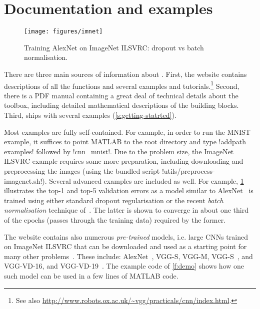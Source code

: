\section{Documentation and examples}\label{s:examples}

\begin{figure}
\centering
\texttt{[image: figures/imnet]}
\vspace{-1em}
\caption{Training AlexNet on ImageNet ILSVRC: dropout vs batch normalisation.}\label{f:imnet}
\end{figure}

There are three main sources of information about \matconvnet. First, the website contains descriptions of all the functions and several examples and tutorials.\footnote{\small See also \url{http://www.robots.ox.ac.uk/~vgg/practicals/cnn/index.html}.} Second, there is a PDF manual containing a great deal of technical details about the toolbox, including detailed mathematical descriptions of the building blocks. Third, \matconvnet ships with several examples (\cref{s:getting-statrted}).

Most examples are fully self-contained. For example, in order to run the MNIST example, it suffices to point MATLAB to the \matconvnet root directory and type !addpath examples! followed by !cnn_mnist!. Due to the problem size, the ImageNet ILSVRC example requires some more preparation, including downloading and preprocessing the images (using the bundled script !utils/preprocess-imagenet.sh!). Several advanced examples are included as well. For example, \cref{f:imnet} illustrates the top-1 and top-5 validation errors as a model similar to AlexNet~\cite{krizhevsky12imagenet} is trained using either standard dropout regularisation or the recent \emph{batch normalisation} technique of~\cite{ioffe15batch}. The latter is shown to converge in about one third of the epochs (passes through the training data) required by the former.

The \matconvnet website contains also numerous \emph{pre-trained} models, i.e. large CNNs trained on ImageNet ILSVRC that can be downloaded and used as a starting point for many other problems~\cite{chatfield14return}. These include: AlexNet~\cite{krizhevsky12imagenet}, VGG-S, VGG-M,  VGG-S~\cite{chatfield14return}, and  VGG-VD-16, and VGG-VD-19~\cite{simonyan15very}.  The example code of \cref{f:demo} shows how one such model can be used in a few lines of MATLAB code.

